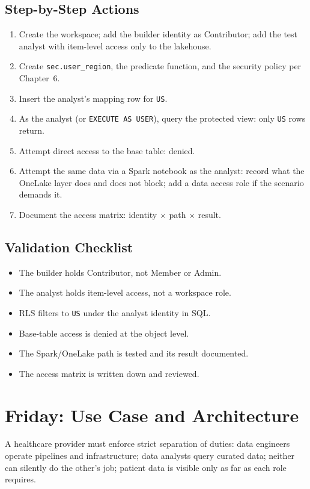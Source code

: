 \subsection{Step-by-Step Actions}
\begin{enumerate}
    \item Create the workspace; add the builder identity as Contributor; add the test analyst with item-level access only to the lakehouse.
    \item Create \texttt{sec.user\_region}, the predicate function, and the security policy per Chapter~6.
    \item Insert the analyst's mapping row for \texttt{US}.
    \item As the analyst (or \texttt{EXECUTE AS USER}), query the protected view: only \texttt{US} rows return.
    \item Attempt direct access to the base table: denied.
    \item Attempt the same data via a Spark notebook as the analyst: record what the OneLake layer does and does not block; add a data access role if the scenario demands it.
    \item Document the access matrix: identity $\times$ path $\times$ result.
\end{enumerate}

\subsection{Validation Checklist}
\begin{itemize}
    \item The builder holds Contributor, not Member or Admin.
    \item The analyst holds item-level access, not a workspace role.
    \item RLS filters to \texttt{US} under the analyst identity in SQL.
    \item Base-table access is denied at the object level.
    \item The Spark/OneLake path is tested and its result documented.
    \item The access matrix is written down and reviewed.
\end{itemize}

\section{Friday: Use Case and Architecture}
A healthcare provider must enforce strict separation of duties: data engineers operate pipelines and infrastructure; data analysts query curated data; neither can silently do the other's job; patient data is visible only as far as each role requires.

